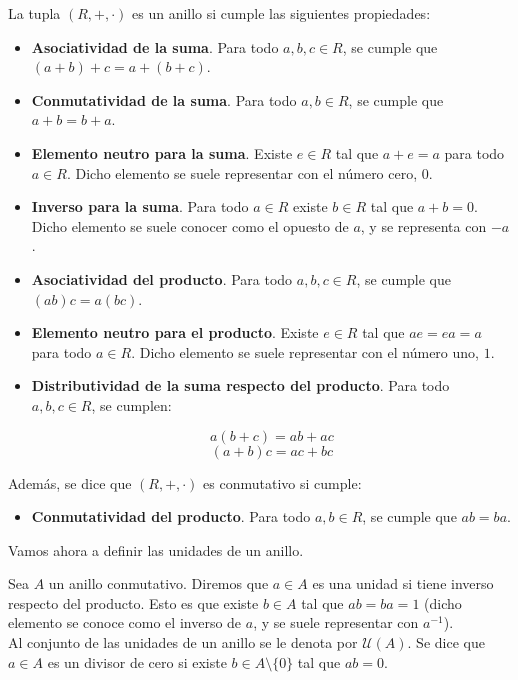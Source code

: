 \begin{definicion}
	La tupla $(R, +, \cdot)$ es un anillo si cumple las siguientes propiedades:
	
	\begin{itemize}
		\item \textbf{Asociatividad de la suma}. Para todo $a, b, c \in R$, se cumple que $(a + b) + c = a + (b + c)$.
		
		\item \textbf{Conmutatividad de la suma}. Para todo $a, b \in R$, se cumple que $a + b = b + a$.
		
		\item \textbf{Elemento neutro para la suma}. Existe $e \in R$ tal que $a + e = a$ para todo $a \in R$. Dicho elemento se suele representar con el número cero, $0$.
		
		\item \textbf{Inverso para la suma}. Para todo $a \in R$ existe $b \in R$ tal que $a + b = 0$. Dicho elemento se suele conocer como el opuesto de $a$, y se representa con $-a$.
		
		\item \textbf{Asociatividad del producto}. Para todo $a, b, c \in R$, se cumple que $(ab)c = a(bc)$.
		
		\item \textbf{Elemento neutro para el producto}. Existe $e \in R$ tal que $ae = ea = a$ para todo $a \in R$. Dicho elemento se suele representar con el número uno, $1$.
		
		\item \textbf{Distributividad de la suma respecto del producto}. Para todo $a, b, c \in R$, se cumplen:
		
		\[ a(b + c) = ab + ac \]
		\[ (a + b)c = ac + bc \]
	\end{itemize}
	
	Además, se dice que $(R, +, \cdot)$ es conmutativo si cumple:
	
	\begin{itemize}
		\item \textbf{Conmutatividad del producto}. Para todo $a, b \in R$, se cumple que $ab = ba$.
	\end{itemize}
\end{definicion}

Vamos ahora a definir las unidades de un anillo.

\begin{definicion}
	Sea $A$ un anillo conmutativo. Diremos que $a \in A$ es una unidad si tiene inverso respecto del producto. Esto es que existe $b \in A$ tal que $ab = ba = 1$ (dicho elemento se conoce como el inverso de $a$, y se suele representar con $a^{-1}$).\\
	
	Al conjunto de las unidades de un anillo se le denota por $\mathcal{U}(A)$. Se dice que $a \in A$ es un divisor de cero si existe $b \in A \setminus \{0\}$ tal que $ab = 0$.
\end{definicion}

